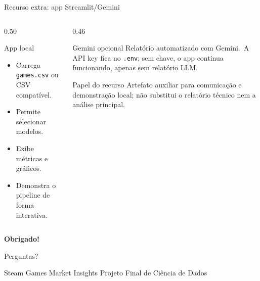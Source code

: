 \documentclass[aspectratio=169]{beamer}
\begin{document}
\begin{frame}{Recurso extra: app Streamlit/Gemini}
\small
\begin{columns}[T,onlytextwidth]
  \begin{column}{0.50\textwidth}
    \begin{block}{App local}
      \begin{itemize}
        \item Carrega \texttt{games.csv} ou CSV compatível.
        \item Permite selecionar modelos.
        \item Exibe métricas e gráficos.
        \item Demonstra o pipeline de forma interativa.
      \end{itemize}
    \end{block}
  \end{column}

  \begin{column}{0.46\textwidth}
    \begin{exampleblock}{Gemini opcional}
      Relatório automatizado com Gemini.\
      A API key fica no \texttt{.env}; sem chave, o app continua funcionando, apenas sem relatório LLM.
    \end{exampleblock}

    \vspace{0.10cm}

    \begin{block}{Papel do recurso}
      \footnotesize
      Artefato auxiliar para comunicação e demonstração local; não substitui o relatório técnico nem a análise principal.
    \end{block}
  \end{column}
\end{columns}
\end{frame}
\begin{frame}[plain]
\centering
\vspace{1.2cm}

{\Huge\bfseries Obrigado!}

\vspace{0.45cm}

{\Large Perguntas?}

\vfill

{\small Steam Games Market Insights \textbar{} Projeto Final de Ciência de Dados}

\end{frame}
\end{document}
